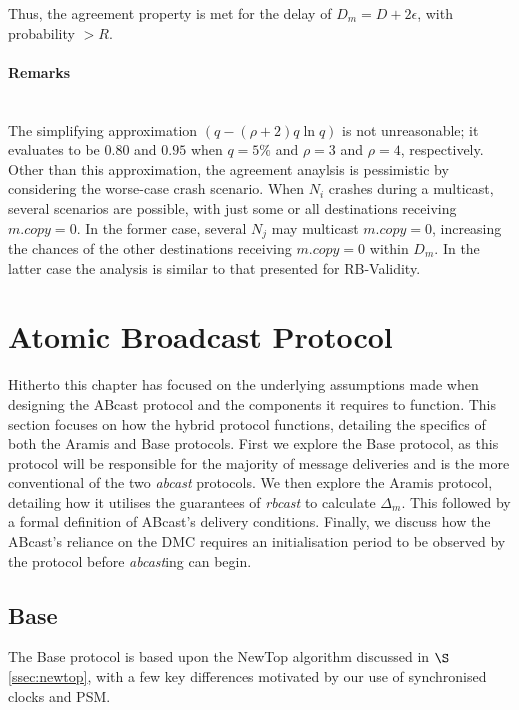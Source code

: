     Thus, the agreement property is met for the delay of $D_m = D + 2\epsilon$, with probability $> R$.  
    
    \paragraph{Remarks} \hfill \\
    The simplifying approximation $(q - (\rho + 2) q \ln q)$ is not unreasonable; it evaluates to be $0.80$ and $0.95$ when $q = 5\%$ and $\rho = 3$ and $\rho = 4$, respectively.  Other than this approximation, the agreement anaylsis is pessimistic by considering the worse-case crash scenario.  When $N_i$ crashes during a multicast, several scenarios are possible, with just some or all destinations receiving $m.copy = 0$.  In the former case, several $N_j$ may multicast $m.copy = 0$, increasing the chances of the other destinations receiving $m.copy = 0$ within $D_m$.  In the latter case the analysis is similar to that presented for RB-Validity.  
    
   
\clearpage
\section{Atomic Broadcast Protocol}\label{sec:ABcast}
Hitherto this chapter has focused on the underlying assumptions made when designing the \textsf{ABcast} protocol and the components it requires to function.  This section focuses on how the hybrid protocol functions, detailing the specifics of both the \textsf{Aramis} and \textsf{Base} protocols.  First we explore the \textsf{Base} protocol, as this protocol will be responsible for the majority of message deliveries and is the more conventional of the two \emph{abcast} protocols.  We then explore the \textsf{Aramis} protocol, detailing how it utilises the guarantees of \emph{rbcast} to calculate $\Delta_m$.   This followed by a formal definition of \textsf{ABcast}'s delivery conditions.  Finally, we discuss how the \textsf{ABcast}'s reliance on the DMC requires an initialisation period to be observed by the protocol before \emph{abcast}ing can begin.  

    \subsection{Base}
    The \textsf{Base} protocol is based upon the NewTop \citep{Ezhilchelvan:1995:NFG:876885.880005} algorithm discussed in $\S$ \ref{ssec:newtop}, with a few key differences motivated by our use of synchronised clocks and PSM.  
    
